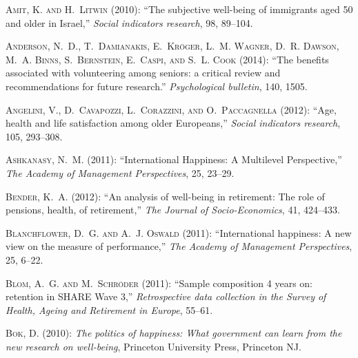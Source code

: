 \documentclass[10pt, letterpaper]{article}
\begin{document}
\begin{spacing}{1.4}
\begin{thebibliography}{91}
\textsc{Amit, K. and H.~Litwin} (2010): \enquote{The subjective well-being of
  immigrants aged 50 and older in Israel,} \emph{Social indicators research},
  98, 89--104.

\textsc{Anderson, N.~D., T.~Damianakis, E.~Kr{\"o}ger, L.~M. Wagner, D.~R.
  Dawson, M.~A. Binns, S.~Bernstein, E.~Caspi, and S.~L. Cook} (2014):
  \enquote{The benefits associated with volunteering among seniors: a critical
  review and recommendations for future research.} \emph{Psychological
  bulletin}, 140, 1505.

\textsc{Angelini, V., D.~Cavapozzi, L.~Corazzini, and O.~Paccagnella} (2012):
  \enquote{Age, health and life satisfaction among older Europeans,}
  \emph{Social indicators research}, 105, 293--308.

\textsc{Ashkanasy, N.~M.} (2011): \enquote{International Happiness: A
  Multilevel Perspective,} \emph{The Academy of Management Perspectives}, 25,
  23--29.

\textsc{Bender, K.~A.} (2012): \enquote{An analysis of well-being in
  retirement: The role of pensions, health, of retirement,} \emph{The Journal
  of Socio-Economics}, 41, 424--433.

\textsc{Blanchflower, D.~G. and A.~J. Oswald} (2011): \enquote{International
  happiness: A new view on the measure of performance,} \emph{The Academy of
  Management Perspectives}, 25, 6--22.

\textsc{Blom, A.~G. and M.~Schr{\"o}der} (2011): \enquote{Sample composition 4
  years on: retention in SHARE Wave 3,} \emph{Retrospective data collection in
  the Survey of Health, Ageing and Retirement in Europe}, 55--61.

\textsc{Bok, D.} (2010): \emph{The politics of happiness: What government can
  learn from the new research on well-being}, Princeton University Press,
  Princeton NJ.


\end{thebibliography}
\end{spacing}
\end{document}
